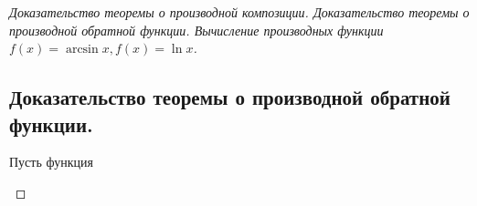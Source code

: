 \begin{proof}[Доказательство теоремы о производной композиции. Доказательство теоремы о производной обратной функции. Вычисление производных функции $f(x) = \arcsin x, f(x) = \ln x$]
    \subsection*{Доказательство теоремы о производной обратной функции.}
    \begin{note}[amber]
        Пусть функция
        
        \begin{note}[purple]
           
        \end{note}
    \end{note}
\end{proof}
